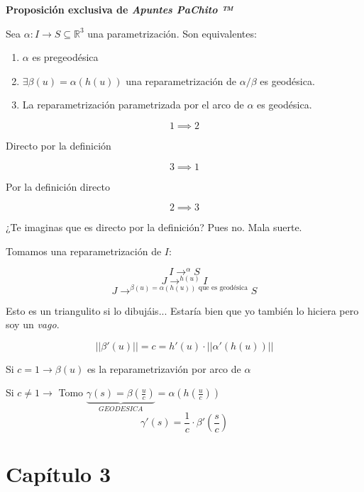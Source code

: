 \documentclass[openany]{book}
\begin{document}
\begin{proposition}
  { \color{turquoise} \textbf{Proposición exclusiva de \textit{Apuntes PaChito ™}}}

  Sea $\alpha : I \to S \subseteq \mathbb{R}^{ 3 } $ una parametrización. Son equivalentes:

  \begin{enumerate}
    \item $\alpha$ es pregeodésica
    \item $\exists \beta (u) = \alpha (h(u))$ una reparametrización de $\alpha /\beta $ es geodésica.
    \item La reparametrización parametrizada por el arco de $\alpha $ es geodésica.
  \end{enumerate}
\end{proposition}
\begin{demonstration}
  $$ 1 \implies 2 $$

  Directo por la definición

  $$ 3 \implies 1 $$

  Por la definición directo

  $$ 2 \implies 3 $$

  ¿Te imaginas que es directo por la definición? Pues no. Mala suerte.

  Tomamos una reparametrización de $I$:

  $$ I \to^\alpha S $$
  $$ J \to^{h(u)} I $$
  $$ J \to^{\beta (u) = \alpha (h(u)) \text{ que es geodésica}} S $$

  Esto es un triangulito si lo dibujáis... Estaría bien que yo también lo hiciera pero soy un \textit{vago}.

  $$ ||\beta '(u)||= c = h'(u) \cdot ||\alpha '(h(u))|| $$

  Si $c=1 \to \beta (u)$ es la reparametrizavión por arco de $\alpha $

  Si $c \ne 1 \to $ Tomo $\underbrace{ \gamma (s) = \beta(\frac{u}{c}) }_{ GEODESICA } = \alpha (h(\frac{u}{c}))$
  $$ \gamma '(s) = \dfrac{1}{c} \cdot  \beta'\left(\frac{s}{c}\right) $$
\end{demonstration}











\chapter{Capítulo 3}
\end{document}
